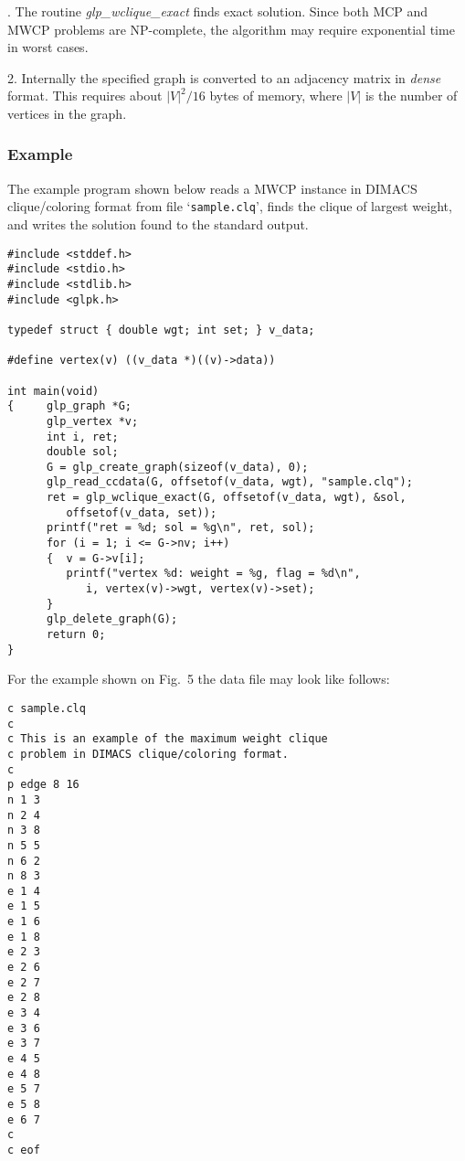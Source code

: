 \documentclass[dvipdfm,11pt]{report}
\begin{document}
\noindent{}. The routine {\it glp\_wclique\_exact} finds exact solution. Since
both MCP and MWCP problems are NP-complete, the algorithm may require
exponential time in worst cases.

2. Internally the specified graph is converted to an adjacency matrix
in {\it dense} format. This requires about $|V|^2/16$ bytes of memory,
where $|V|$ is the number of vertices in the graph.

\subsubsection*{Example}

The example program shown below reads a MWCP instance in DIMACS
clique/coloring format from file `\verb|sample.clq|', finds the clique
of largest weight, and writes the solution found to the standard output.

\begin{footnotesize}
\begin{verbatim}
#include <stddef.h>
#include <stdio.h>
#include <stdlib.h>
#include <glpk.h>

typedef struct { double wgt; int set; } v_data;

#define vertex(v) ((v_data *)((v)->data))

int main(void)
{     glp_graph *G;
      glp_vertex *v;
      int i, ret;
      double sol;
      G = glp_create_graph(sizeof(v_data), 0);
      glp_read_ccdata(G, offsetof(v_data, wgt), "sample.clq");
      ret = glp_wclique_exact(G, offsetof(v_data, wgt), &sol,
         offsetof(v_data, set));
      printf("ret = %d; sol = %g\n", ret, sol);
      for (i = 1; i <= G->nv; i++)
      {  v = G->v[i];
         printf("vertex %d: weight = %g, flag = %d\n",
            i, vertex(v)->wgt, vertex(v)->set);
      }
      glp_delete_graph(G);
      return 0;
}
\end{verbatim}
\end{footnotesize}

\noindent
For the example shown on Fig.~5 the data file may look like follows:

\begin{footnotesize}
\begin{verbatim}
c sample.clq
c
c This is an example of the maximum weight clique
c problem in DIMACS clique/coloring format.
c
p edge 8 16
n 1 3
n 2 4
n 3 8
n 5 5
n 6 2
n 8 3
e 1 4
e 1 5
e 1 6
e 1 8
e 2 3
e 2 6
e 2 7
e 2 8
e 3 4
e 3 6
e 3 7
e 4 5
e 4 8
e 5 7
e 5 8
e 6 7
c
c eof
\end{verbatim}
\end{footnotesize}
\end{document}
